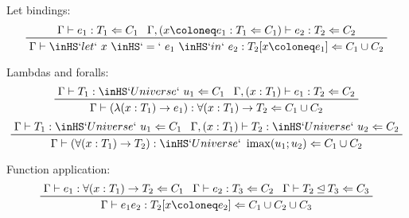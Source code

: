 \documentclass[11pt, twoside, reqno]{book}
\DeclareMathOperator{\imax}{imax}
\newcommand{\subsumedBy}{\unlhd}
\begin{document}
\begin{appdices}
Let bindings:
\begin{displaymath}
\prftree{\Gamma \vdash e_1 : T_1 \Leftarrow C_1}{\Gamma, (x \coloneq e_1 : T_1 \Leftarrow C_1) \vdash e_2 : T_2 \Leftarrow C_2}{\Gamma \vdash \inHS`let`\ x\ \inHS`=`\ e_1\ \inHS`in`\ e_2 : T_2[x \coloneq e_1] \Leftarrow C_1 \cup C_2}
\end{displaymath}

Lambdas and foralls:
\begin{displaymath}
\prftree{\Gamma \vdash T_1 : \inHS`Universe`\ u_1 \Leftarrow C_1}{\Gamma, (x : T_1) \vdash e_1 : T_2 \Leftarrow C_2}{\Gamma \vdash (\lambda(x : T_1) \to e_1) : \forall(x : T_1) \to T_2 \Leftarrow C_1 \cup C_2}
\end{displaymath}
\begin{displaymath}
\prftree{\Gamma \vdash T_1 : \inHS`Universe`\ u_1 \Leftarrow C_1}{\Gamma, (x : T_1) \vdash T_2 : \inHS`Universe`\ u_2 \Leftarrow C_2}{\Gamma \vdash (\forall(x : T_1) \to T_2) : \inHS`Universe`\ \imax(u_1; u_2) \Leftarrow C_1 \cup C_2}
\end{displaymath}

Function application:
\begin{displaymath}
\prftree{\Gamma \vdash e_1 : \forall(x : T_1) \to T_2 \Leftarrow C_1}{\Gamma \vdash e_2 : T_3 \Leftarrow C_2}{\Gamma \vdash T_2 \subsumedBy T_3 \Leftarrow C_3}{\Gamma \vdash e_1 e_2 : T_2[x \coloneq e_2] \Leftarrow C_1 \cup C_2 \cup C_3}
\end{displaymath}


\end{appdices}
\end{document}
